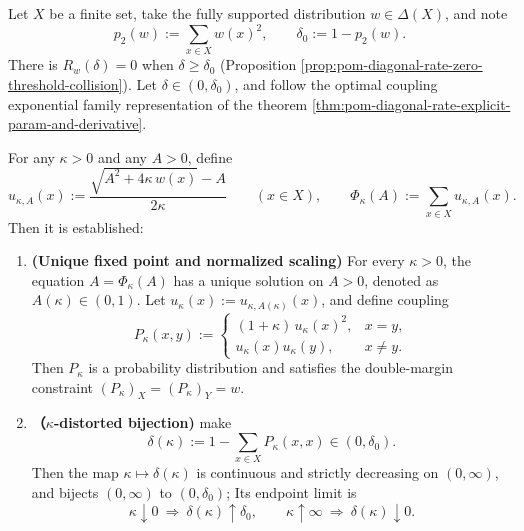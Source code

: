 
\begin{theorem}\label{thm:pom-diagonal-rate-scalar-collapse}
Let \(X\) be a finite set, take the fully supported distribution \(w\in\Delta(X)\), and note
\[
p_2(w):=\sum_{x\in X}w(x)^2,
\qquad
\delta_0:=1-p_2(w).
\]
There is \(R_w(\delta)=0\) when \(\delta\ge \delta_0\) (Proposition \ref{prop:pom-diagonal-rate-zero-threshold-collision}).
Let \(\delta\in(0,\delta_0)\), and follow the optimal coupling exponential family representation of the theorem \ref{thm:pom-diagonal-rate-explicit-param-and-derivative}.
\par
For any \(\kappa>0\) and any \(A>0\), define
\[
u_{\kappa,A}(x):=\frac{\sqrt{A^2+4\kappa\,w(x)}-A}{2\kappa}\qquad(x\in X),
\qquad
\Phi_\kappa(A):=\sum_{x\in X}u_{\kappa,A}(x).
\]
Then it is established:
\begin{enumerate}
\item \textbf{(Unique fixed point and normalized scaling)}
For every \(\kappa>0\), the equation \(A=\Phi_\kappa(A)\) has a unique solution on \(A>0\), denoted as \(A(\kappa)\in(0,1)\).
Let \(u_\kappa(x):=u_{\kappa,A(\kappa)}(x)\), and define coupling
  \[
  P_\kappa(x,y):=
  \begin{cases}
  (1+\kappa)\,u_\kappa(x)^2, & x=y,\\
  u_\kappa(x)u_\kappa(y), & x\ne y.
  \end{cases}
  \]
Then \(P_\kappa\) is a probability distribution and satisfies the double-margin constraint \((P_\kappa)_X=(P_\kappa)_Y=w\).

\item \textbf{（\(\kappa\)-distorted bijection)}
make
  \[
  \delta(\kappa):=1-\sum_{x\in X}P_\kappa(x,x)\in(0,\delta_0).
  \]
Then the map \(\kappa\mapsto \delta(\kappa)\) is continuous and strictly decreasing on \((0,\infty)\), and bijects \((0,\infty)\) to \((0,\delta_0)\);
Its endpoint limit is
  \[
  \kappa\downarrow 0\ \Longrightarrow\ \delta(\kappa)\uparrow\delta_0,
  \qquad
  \kappa\uparrow\infty\ \Longrightarrow\ \delta(\kappa)\downarrow 0.
  \]
\end{enumerate}
\end{theorem}

